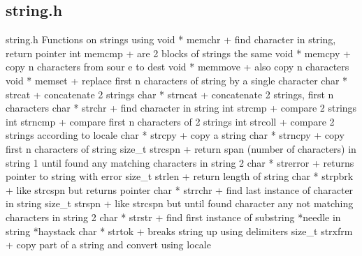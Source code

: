 
\subsection{string.h}
string.h Functions on strings using
void * memchr
+ find character in string, return pointer
int memcmp
+ are 2 blocks of strings the same
void * memcpy
+ copy n  characters from sour e to dest
void * memmove
+ also copy n characters
void * memset
+ replace first n characters of string by a single character
char * strcat
+ concatenate 2 strings
char * strncat
+ concatenate 2 strings, first n characters
char * strchr
+ find character in string
int strcmp
+ compare 2 strings
int strncmp
+ compare first n characters of 2 strings
int strcoll
+ compare 2 strings according to locale
char * strcpy
+ copy a string
char * strncpy
+ copy first n characters of string
size_t strcspn
+ return span (number of characters) in string 1 until found any matching characters in string 2
char * strerror
+ returns pointer to string with error
size_t strlen
+ return length of string
char * strpbrk
+ like strcspn but returns pointer
char * strrchr
+ find last instance of character in string
size_t strspn
+ like strcspn but until found character any not matching characters in string 2
char * strstr
+ find first instance of substring *needle in string *haystack
char * strtok
+ breaks string up using delimiters
size_t strxfrm
+ copy part of a string and convert using locale

